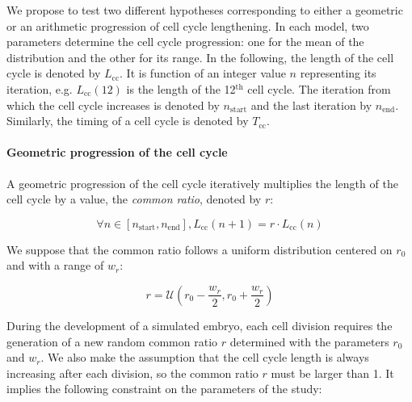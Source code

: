We propose to test two different hypotheses corresponding to either a geometric or an arithmetic progression of cell cycle lengthening. In each model, two parameters determine the cell cycle progression: one for the mean of the distribution and the other for its range. In the following, the length of the cell cycle is denoted by $L_{\mathrm{cc}}$. It is function of an integer value $n$ representing its iteration, e.g. $L_{\mathrm{cc}}(12)$ is the length of the 12$^{\mathrm{th}}$ cell cycle. The iteration from which the cell cycle increases is denoted by $n_{\mathrm{start}}$ and the last iteration by $n_{\mathrm{end}}$. Similarly, the timing of a cell cycle is denoted by $T_{\mathrm{cc}}$.

\paragraph{Geometric progression of the cell cycle}


A geometric progression of the cell cycle iteratively multiplies the length of the cell cycle by a value, the \textit{common ratio}, denoted by $r$:

$$\forall n \in \left[ n_{\mathrm{start}}, n_{\mathrm{end}} \right], L_{\mathrm{cc}}(n+1) = r \cdot L_{\mathrm{cc}}(n)$$

We suppose that the common ratio follows a uniform distribution centered on $r_0$ and with a range of $w_r$:

$$r = \mathcal{U}(r_0 - \frac{w_r}{2}, r_0 + \frac{w_r}{2})$$

During the development of a simulated embryo, each cell division requires the generation of a new random common ratio $r$ determined with the parameters $r_0$ and $w_r$. We also make the assumption that the cell cycle length is always increasing after each division, so the common ratio $r$ must be larger than 1. It implies the following constraint on the parameters of the study:

